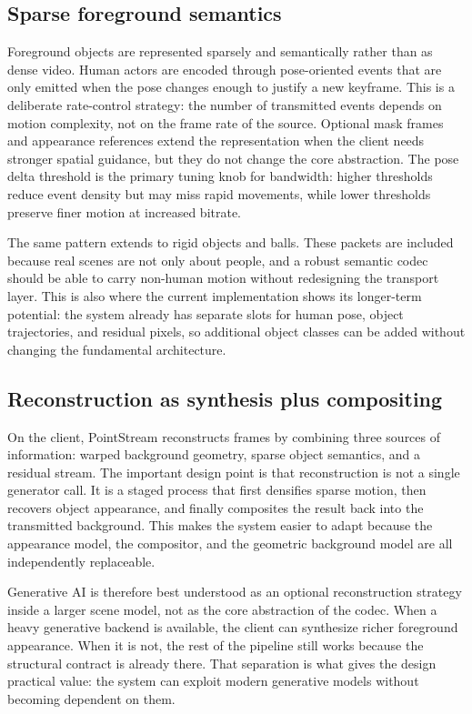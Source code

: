 \documentclass[manuscript, screen]{acmart}
\begin{document}
\subsection{Sparse foreground semantics}
Foreground objects are represented sparsely and semantically rather than as dense video. Human actors are encoded through pose-oriented events that are only emitted when the pose changes enough to justify a new keyframe. This is a deliberate rate-control strategy: the number of transmitted events depends on motion complexity, not on the frame rate of the source. Optional mask frames and appearance references extend the representation when the client needs stronger spatial guidance, but they do not change the core abstraction. The pose delta threshold is the primary tuning knob for bandwidth: higher thresholds reduce event density but may miss rapid movements, while lower thresholds preserve finer motion at increased bitrate.

The same pattern extends to rigid objects and balls. These packets are included because real scenes are not only about people, and a robust semantic codec should be able to carry non-human motion without redesigning the transport layer. This is also where the current implementation shows its longer-term potential: the system already has separate slots for human pose, object trajectories, and residual pixels, so additional object classes can be added without changing the fundamental architecture.

\subsection{Reconstruction as synthesis plus compositing}
On the client, PointStream reconstructs frames by combining three sources of information: warped background geometry, sparse object semantics, and a residual stream. The important design point is that reconstruction is not a single generator call. It is a staged process that first densifies sparse motion, then recovers object appearance, and finally composites the result back into the transmitted background. This makes the system easier to adapt because the appearance model, the compositor, and the geometric background model are all independently replaceable.

Generative AI is therefore best understood as an optional reconstruction strategy inside a larger scene model, not as the core abstraction of the codec. When a heavy generative backend is available, the client can synthesize richer foreground appearance. When it is not, the rest of the pipeline still works because the structural contract is already there. That separation is what gives the design practical value: the system can exploit modern generative models without becoming dependent on them.
\end{document}
